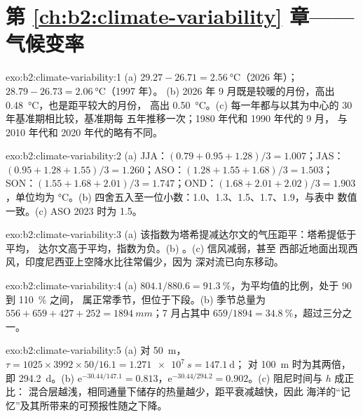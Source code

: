 \section*{第 \ref{ch:b2:climate-variability} 章——气候变率}

\begin{solution}{exo:b2:climate-variability:1}
(a) $29.27 - 26.71 = \qty{2.56}{\celsius}$（2026 年）；$28.79 - 26.73 = \qty{2.06}{\celsius}$（1997 年）。
(b) 2026 年 9 月既是较暖的月份，高出 \qty{0.48}{\celsius}，也是距平较大的月份，
高出 \qty{0.50}{\celsius}。(c) 每一年都与以其为中心的 30 年基准期相比较，基准期每
五年推移一次；1980 年代和 1990 年代的 9 月，
与 2010 年代和 2020 年代的略有不同。
\end{solution}

\begin{solution}{exo:b2:climate-variability:2}
(a) JJA：$(0.79 + 0.95 + 1.28)/3 = 1.007$；JAS：$(0.95 + 1.28 + 1.55)/3 = 1.260$；ASO：$(1.28 +
1.55 + 1.68)/3 = 1.503$；SON：$(1.55 + 1.68 + 2.01)/3 = 1.747$；OND：$(1.68 + 2.01 + 2.02)/3 =
1.903$，单位均为 \unit{\celsius}。(b) 四舍五入至一位小数：1.0、1.3、1.5、1.7、1.9，与表中
数值一致。(c) ASO 2023 时为 1.5。
\end{solution}

\begin{solution}{exo:b2:climate-variability:3}
(a) 该指数为塔希提减达尔文的气压距平：塔希提低于平均，
达尔文高于平均，指数为负。(b) 。(c) 信风减弱，甚至
西部近地面出现西风，印度尼西亚上空降水比往常偏少，因为
深对流已向东移动。
\end{solution}

\begin{solution}{exo:b2:climate-variability:4}
(a) $804.1/880.6 = \qty{91.3}{\percent}$，为平均值的比例，处于 90 到 \qty{110}{\percent} 之间，
属正常季节，但位于下段。(b) 季节总量为 $556 + 659 + 427 + 252 =
\qty{1894}{mm}$；7 月占其中 $659/1894 = \qty{34.8}{\percent}$，超过三分之一。
\end{solution}

\begin{solution}{exo:b2:climate-variability:5}
(a) 对 \qty{50}{m}，$\tau = 1025 \times 3992 \times 50/16.1 = \qty{1.271e7}{s} = \qty{147.1}{\day}$；
对 \qty{100}{m} 时为其两倍，即 \qty{294.2}{\day}。(b) $\mathrm{e}^{-30.44/147.1} =
0.813$，$\mathrm{e}^{-30.44/294.2} = 0.902$。(c) 阻尼时间与 $h$ 成正比：
混合层越浅，相同通量下储存的热量越少，距平衰减越快，因此
海洋的“记忆”及其所带来的可预报性随之下降。
\end{solution}

